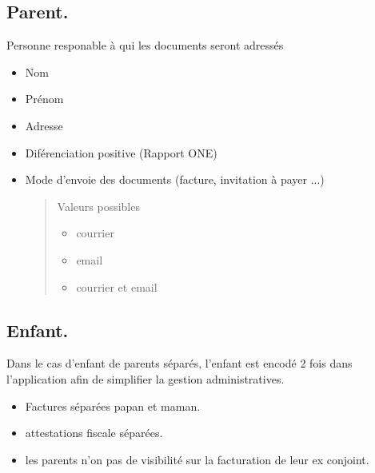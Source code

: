 \documentclass[letterpaper,10pt,english]{sphinxmanual}
\begin{document}
\subsection{Parent.}
\label{checklist:parent}
Personne responable à qui les documents seront adressés
\begin{itemize}
\item {} 
Nom

\item {} 
Prénom

\item {} 
Adresse

\item {} 
Diférenciation positive (Rapport ONE)

\item {} 
Mode d'envoie des documents (facture, invitation à payer ...)
\begin{quote}

Valeurs possibles
\begin{itemize}
\item {} 
courrier

\item {} 
email

\item {} 
courrier et email

\end{itemize}
\end{quote}

\end{itemize}


\subsection{Enfant.}
\label{checklist:enfant}
Dans le cas d'enfant de parents séparés, l'enfant est encodé 2 fois dans l'application afin de simplifier la gestion administratives.
\begin{itemize}
\item {} 
Factures séparées papan et maman.

\item {} 
attestations fiscale séparées.

\item {} 
les parents n'on pas de visibilité sur la facturation de leur ex conjoint.

\end{itemize}
\end{document}

